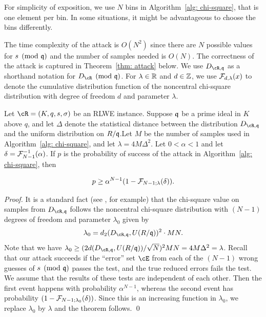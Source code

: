 \documentclass[envcountsame]{llncs}
\begin{document}
\begin{remark}
For simplicity of exposition, we use $N$ bins in Algorithm~\ref{alg: chi-square}, that is one element per bin. In some situations,
it might be advantageous to choose the bins differently.
\end{remark}



The time complexity of the attack is $O(N^2)$ since there are $N$ possible values for $s \pmod {\mathfrak{q}}$ and the number of samples needed is $O(N)$. The correctness of the attack is captured in Theorem~\ref{thm: attack} below. We use $D_{\cR,\fq}$ as a shorthand notation for $D_{\cR} \pmod{\fq}$. For $\lambda \in \mathbb{R}$ and $d \in \mathbb{Z}$, we use $\mathcal{F}_{d,\lambda}(x)$ to denote the cumulative distribution function of the noncentral chi-square distribution with degree of freedom $d$ and parameter $\lambda$.

\begin{theorem} \label{thm: attack}
Let $\cR  = (K,q,s, \sigma)$ be an RLWE instance. Suppose $\mathfrak{q}$ be a prime ideal in $K$ above $q$, and let $\Delta$ denote the statistical distance between the distribution $D_{\cR, \fq}$ and the uniform distribution on $R/\mathfrak{q}$.Let $M$ be the number of samples used in Algorithm~\ref{alg: chi-square}, and let $\lambda = 4 M \Delta^2$. Let $0 < \alpha < 1$ and let $\delta = \mathcal{F}_{N-1}^{-1}(\alpha)$. If $p$ is the probability of success of the attack in Algorithm~\ref{alg: chi-square}, then

$$p  \geq \alpha^{N-1} (1-  \mathcal{F}_{N-1; \lambda}(\delta) ).$$
\end{theorem}

\begin{proof}
It is a standard fact (see \cite{ryabko2004new}, for example) that the chi-square value on samples from $D_{\cR, \fq}$  follows the noncentral chi-square distribution with $(N-1)$ degrees of freedom and parameter $\lambda_0$ given by
\[
    \lambda_0 =  d_2(D_{\cR, \fq}, U(R/\fq))^2 \cdot MN.
\]
Note that we have $\lambda_0 \geq (2d(D_{\cR, \fq}, U(R/\fq))/\sqrt{N})^2 MN = 4M\Delta^2 = \lambda$. Recall that our attack succeeds if the ``error'' set $\cE$ from each of the $(N-1)$ wrong guesses of $s \pmod{\mathfrak{q}}$ passes the test, and the true reduced errors fails the test. We assume that the results of these tests are independent of each other. Then the first event happens with probability $\alpha^{N-1}$, whereas the second event has probability  $(1-  \mathcal{F}_{N-1; \lambda_0}(\delta))$. Since this is an increasing function in $\lambda_0$, we replace $\lambda_0$ by $\lambda$ and the theorem follows.
\qed \end{proof}
\end{document}
